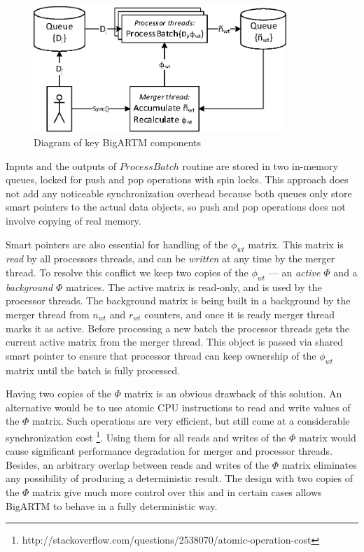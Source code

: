 \documentclass{llncs}
\begin{document}
\begin{figure}[h!]
\begin{centering}
\includegraphics[height=48mm]{diagramm_artm_core.eps}
\caption{Diagram of key BigARTM components}
\label{fig:diagramm_artm_core}
\end{centering}
\end{figure}

Inputs and the outputs of $ProcessBatch$ routine are stored in two in-memory queues,
locked for push and pop operations with spin locks.
This approach does not add any noticeable synchronization overhead because
both queues only store smart pointers to the actual data objects,
so push and pop operations does not involve copying of real memory.

Smart pointers are also essential for handling of the $\phi_{wt}$ matrix.
This matrix is \emph{read} by all processors threads, and can be \emph{written} at any time by the merger thread.
To resolve this conflict we keep two copies of the $\phi_{wt}$ --- an \emph{active $\Phi$} and a \emph{background $\Phi$} matrices.
The active matrix is read-only, and is used by the processor threads.
The background matrix is being built in a background by the merger thread from $n_{wt}$ and $r_{wt}$ counters,
and once it is ready merger thread marks it as active.
Before processing a new batch the processor threads gets the current active matrix from the merger thread.
This object is passed via shared smart pointer to ensure that processor thread can keep ownership of the $\phi_{wt}$ matrix
until the batch is fully processed.

Having two copies of the $\Phi$ matrix is an obvious drawback of this solution.
An alternative would be to use atomic CPU instructions to read and write values of the $\Phi$ matrix.
Such operations are very efficient, but still come at a considerable synchronization cost
\footnote{http://stackoverflow.com/questions/2538070/atomic-operation-cost}.
Using them for all reads and writes of the $\Phi$ matrix would cause significant performance degradation for merger and processor threads.
Besides, an arbitrary overlap between reads and writes of the $\Phi$ matrix eliminates any possibility of producing a deterministic result.
The design with two copies of the $\Phi$ matrix give much more control over this
and in certain cases allows BigARTM to behave in a fully deterministic way.
\end{document}
